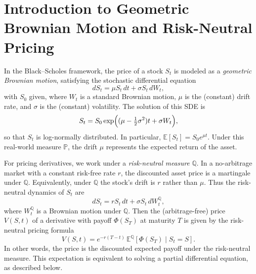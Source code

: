 \section{Introduction to Geometric Brownian Motion and Risk-Neutral Pricing}
In the Black--Scholes framework, the price of a stock \(S_t\) is modeled as a \emph{geometric Brownian motion}, satisfying the stochastic differential equation
\[
dS_t = \mu S_t\,dt + \sigma S_t\,dW_t,
\]
with \(S_0\) given, where \(W_t\) is a standard Brownian motion, \(\mu\) is the (constant) drift rate, and \(\sigma\) is the (constant) volatility.  The solution of this SDE is 
\[
S_t = S_0 \exp\Bigl((\mu - \tfrac{1}{2}\sigma^2)t + \sigma W_t\Bigr),
\]
so that \(S_t\) is log-normally distributed.  In particular, \(\mathbb{E}[S_t] = S_0 e^{\mu t}\).  Under this real-world measure \(\mathbb{P}\), the drift \(\mu\) represents the expected return of the asset.

For pricing derivatives, we work under a \emph{risk-neutral measure} \(\mathbb{Q}\).  In a no-arbitrage market with a constant risk-free rate \(r\), the discounted asset price is a martingale under \(\mathbb{Q}\).  Equivalently, under \(\mathbb{Q}\) the stock’s drift is \(r\) rather than \(\mu\).  Thus the risk-neutral dynamics of \(S_t\) are
\[
dS_t = r S_t\,dt + \sigma S_t\,dW_t^\mathbb{Q},
\]
where \(W_t^\mathbb{Q}\) is a Brownian motion under \(\mathbb{Q}\).  Then the (arbitrage-free) price \(V(S,t)\) of a derivative with payoff \(\Phi(S_T)\) at maturity \(T\) is given by the risk-neutral pricing formula
\[
V(S,t) = e^{-r (T-t)} \,\mathbb{E}^{\mathbb{Q}}[\Phi(S_T)\mid S_t = S].
\]
In other words, the price is the discounted expected payoff under the risk-neutral measure.  This expectation is equivalent to solving a partial differential equation, as described below.

